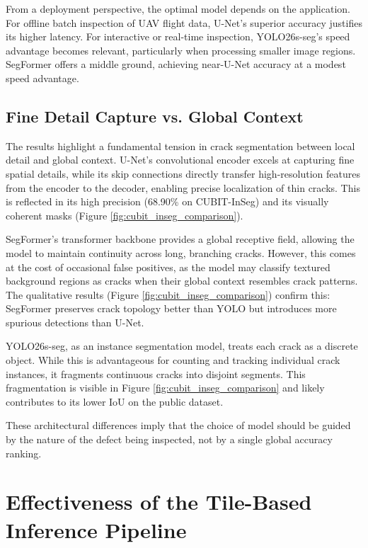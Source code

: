 \hs From a deployment perspective, the optimal model depends on the application. For offline batch inspection of UAV flight data, U-Net's superior accuracy justifies its higher latency. For interactive or real-time inspection, YOLO26s-seg's speed advantage becomes relevant, particularly when processing smaller image regions. SegFormer offers a middle ground, achieving near-U-Net accuracy at a modest speed advantage.

\subsection{Fine Detail Capture vs. Global Context}
\label{subsec:fine_detail_vs_global_context}

\hs The results highlight a fundamental tension in crack segmentation between local detail and global context. U-Net's convolutional encoder excels at capturing fine spatial details, while its skip connections directly transfer high-resolution features from the encoder to the decoder, enabling precise localization of thin cracks. This is reflected in its high precision (68.90\% on CUBIT-InSeg) and its visually coherent masks (Figure \ref{fig:cubit_inseg_comparison}).

\hs SegFormer's transformer backbone provides a global receptive field, allowing the model to maintain continuity across long, branching cracks. However, this comes at the cost of occasional false positives, as the model may classify textured background regions as cracks when their global context resembles crack patterns. The qualitative results (Figure \ref{fig:cubit_inseg_comparison}) confirm this: SegFormer preserves crack topology better than YOLO but introduces more spurious detections than U-Net.

\hs YOLO26s-seg, as an instance segmentation model, treats each crack as a discrete object. While this is advantageous for counting and tracking individual crack instances, it fragments continuous cracks into disjoint segments. This fragmentation is visible in Figure \ref{fig:cubit_inseg_comparison} and likely contributes to its lower IoU on the public dataset.

\hs These architectural differences imply that the choice of model should be guided by the nature of the defect being inspected, not by a single global accuracy ranking.

\section{Effectiveness of the Tile-Based Inference Pipeline}
\label{sec:effectiveness_of_the_tile_based_inference_pipeline}

